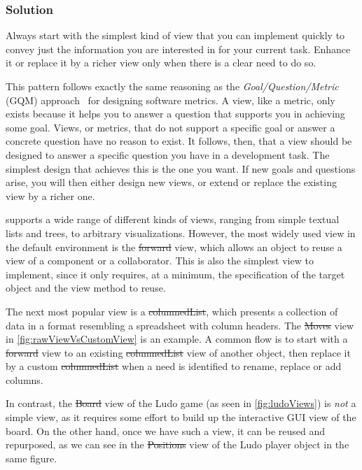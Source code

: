 \documentclass[sigconf]{acmart}
\renewcommand{\nbc}[3]{} %
\newcommand\eog[1]{\nbc{Edward}{#1}{purple}}
\newcommand{\GT}{\lst{GT}\xspace} %
\begin{document}
\subsubsection*{Solution}
Always start with the simplest kind of view that you can implement quickly to convey just the information you are interested in for your current task.
Enhance it or replace it by a richer view only when there is a clear need to do so.

This pattern follows exactly the same reasoning as the \emph{Goal/Question/Metric} (GQM) approach~\cite{Basi94a} for designing software metrics.
A view, like a metric, only exists because it helps you to answer a question that supports you in achieving some goal.
Views, or metrics, that do not support a specific goal or answer a concrete question have no reason to exist.
It follows, then, that a view should be designed to answer a specific question you have in a development task.
The simplest design that achieves this is the one you want.
If new goals and questions arise, you will then either design new views, or extend or replace the existing view by a richer one.

\GT supports a wide range of different kinds of views, ranging from simple textual lists and trees, to arbitrary visualizations.
However, the most widely used view in the default environment is the \st{forward} view, which allows an object to reuse a view of a component or a collaborator.
This is also the simplest view to implement, since it only requires, at a minimum, the specification of the target object and the view method to reuse.

The next most popular view is a \st{columnedList}, which presents a collection of data in a format resembling a spreadsheet with column headers.
The \st{Moves} view in \autoref{fig:rawViewVsCustomView} is an example.
A common flow is to start with a \st{forward} view to an existing \st{columnedList} view of another object, then replace it by a custom \st{columnedList} when a need is identified to rename, replace or add columns.

\eog{The forward view and the column list.
I think talking about the forward view with just this is hard to digest.
Maybe a picture here would help with other kinds of simple views.}

In contrast, the \st{Board} view of the Ludo game (as seen in \autoref{fig:ludoViews}) is \emph{not} a simple view, as it requires some effort to build up the interactive GUI view of the board.
On the other hand, once we have such a view, it can be reused and repurposed, as we can see in the \st{Positions} view of the Ludo player object in the same figure.
\end{document}
